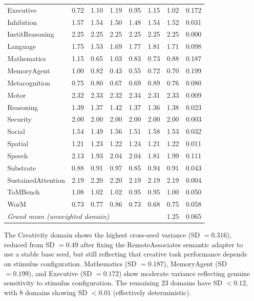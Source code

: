 \documentclass[10pt,landscape]{article}
\begin{document}
\begin{longtable}{@{}lrrrrrrr@{}}
Executive & 0.72 & 1.10 & 1.19 & 0.95 & 1.15 & 1.02 & 0.172 \\
Inhibition & 1.57 & 1.54 & 1.50 & 1.48 & 1.54 & 1.52 & 0.031 \\
InstitReasoning & 2.25 & 2.25 & 2.25 & 2.25 & 2.25 & 2.25 & 0.000 \\
Language & 1.75 & 1.53 & 1.69 & 1.77 & 1.81 & 1.71 & 0.098 \\
Mathematics & 1.15 & 0.65 & 1.03 & 0.83 & 0.73 & 0.88 & 0.187 \\
MemoryAgent & 1.00 & 0.82 & 0.43 & 0.55 & 0.72 & 0.70 & 0.199 \\
Metacognition & 0.75 & 0.80 & 0.67 & 0.69 & 0.89 & 0.76 & 0.080 \\
Motor & 2.32 & 2.33 & 2.32 & 2.34 & 2.31 & 2.33 & 0.009 \\
Reasoning & 1.39 & 1.37 & 1.42 & 1.37 & 1.36 & 1.38 & 0.023 \\
Security & 2.00 & 2.00 & 2.00 & 2.00 & 2.00 & 2.00 & 0.003 \\
Social & 1.54 & 1.49 & 1.56 & 1.51 & 1.58 & 1.53 & 0.032 \\
Spatial & 1.21 & 1.23 & 1.22 & 1.24 & 1.21 & 1.22 & 0.011 \\
Speech & 2.13 & 1.93 & 2.04 & 2.04 & 1.81 & 1.99 & 0.111 \\
Substrate & 0.88 & 0.91 & 0.97 & 0.85 & 0.94 & 0.91 & 0.043 \\
SustainedAttention & 2.19 & 2.20 & 2.20 & 2.19 & 2.19 & 2.19 & 0.004 \\
ToMBench & 1.08 & 1.02 & 1.02 & 0.95 & 0.95 & 1.00 & 0.050 \\
WorM & 0.73 & 0.77 & 0.86 & 0.73 & 0.68 & 0.75 & 0.058 \\
\midrule
\multicolumn{6}{l}{\emph{Grand mean (unweighted domain)}} & 1.25 & 0.065 \\
\end{longtable}

\noindent The Creativity domain shows the highest cross-seed variance (SD $= 0.316$), reduced from SD $= 0.49$ after fixing the RemoteAssociates semantic adapter to use a stable base seed, but still reflecting that creative task performance depends on stimulus configuration. Mathematics (SD $= 0.187$), MemoryAgent (SD $= 0.199$), and Executive (SD $= 0.172$) show moderate variance reflecting genuine sensitivity to stimulus configuration. The remaining 23 domains have SD $< 0.12$, with 8 domains showing SD $< 0.01$ (effectively deterministic).

\end{document}
